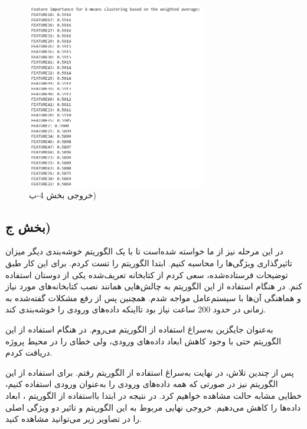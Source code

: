 \documentclass{article}
\begin{document}
\begin{figure}[ht]
        \centering
        \includegraphics[width=0.7\textwidth]{4-2.png}
        \caption{خروجی بخش 4-ب)}
        \label{fig:fig6}
\end{figure}

\newpage

\lr{}


\newpage
\subsection{بخش ج)}
در این مرحله نیز از ما خواسته شده‌است تا با یک الگوریتم خوشه‌بندی دیگر میزان تاثیرگذاری ویژگی‌ها را محاسبه کنیم. ابتدا الگوریتم  را تست کردم. برای این کار طبق توضیحات فرستاده‌شده، سعی کردم از کتابخانه تعریف‌شده یکی از دوستان استفاده کنم. در هنگام استفاده از این الگوریتم به چالش‌هایی همانند نصب کتابخانه‌های مورد نیاز و هماهنگی آن‌ها با سیستم‌عامل مواجه شدم. همچنین پس از رفع مشکلات گفته‌شده به زمانی در حدود 200 ساعت نیاز بود تااینکه داده‌های ورودی را خوشه‌بندی کند.

به‌عنوان جایگزین به‌سراغ استفاده از الگوریتم  می‌روم. در هنگام استفاده از این الگوریتم حتی با وجود کاهش ابعاد داده‌های ورودی، ولی خطای  را در محیط پروژه  دریافت کردم.

پس از چندین تلاش، در نهایت به‌سراغ استفاده از الگوریتم  رفتم. برای استفاده از این الگوریتم نیز در صورتی که همه داده‌های ورودی را به‌عنوان ورودی استفاده کنیم، خطایی مشابه حالت  مشاهده خواهیم کرد. در نتیجه در ابتدا بااستفاده از الگوریتم ، ابعاد داده‌ها را کاهش می‌دهیم. خروجی نهایی مربوط به این الگوریتم و تائیر دو ویژگی اصلی را در تصاویر زیر می‌توانید مشاهده کنید.
\end{document}
